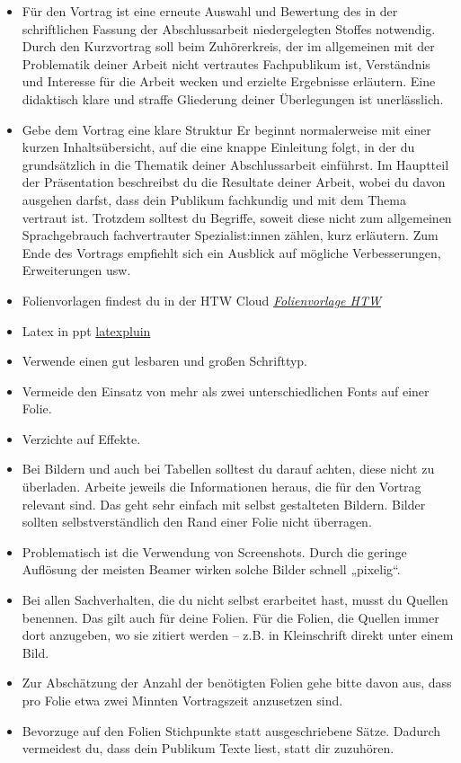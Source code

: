 \begin{itemize}
\item 
Für den Vortrag ist eine erneute Auswahl und Bewertung des in der schriftlichen Fassung der Abschlussarbeit niedergelegten Stoffes notwendig. Durch den Kurzvortrag soll beim Zuhörerkreis, der im allgemeinen mit der Problematik deiner Arbeit nicht vertrautes Fachpublikum ist, Verständnis und Interesse für die Arbeit wecken und erzielte Ergebnisse erläutern. Eine didaktisch klare und straffe Gliederung deiner Überlegungen ist unerlässlich. 

\item
Gebe dem Vortrag eine klare Struktur Er beginnt normalerweise mit einer kurzen Inhaltsübersicht, auf die eine knappe Einleitung folgt, in der du grundsätzlich in die Thematik deiner Abschlussarbeit einführst. Im Hauptteil der Präsentation beschreibst du die Resultate deiner Arbeit, wobei du davon ausgehen darfst, dass dein Publikum fachkundig und mit dem Thema vertraut ist. Trotzdem solltest du Begriffe, soweit diese nicht zum allgemeinen Sprachgebrauch  fachvertrauter Spezialist:innen zählen, kurz erläutern. Zum Ende des Vortrags empfiehlt sich ein Ausblick auf mögliche Verbesserungen, Erweiterungen usw.

    \item Folienvorlagen findest du in der HTW Cloud \hyperlink{
https://corporatedesign.htw-berlin.de/musterdokumente/powerpoint-vorlagen/}{\emph{Folienvorlage HTW}} 
\item Latex in ppt
\hyperlink{http://www.jonathanleroux.org/software/iguanatex/}{latexpluin}
\item Verwende einen gut lesbaren und großen Schrifttyp. 
\item Vermeide den Einsatz von mehr als zwei unterschiedlichen Fonts auf einer Folie.
\item 
Verzichte auf Effekte. 
\item Bei Bildern und auch bei Tabellen solltest du darauf achten, diese nicht zu überladen. Arbeite jeweils die Informationen heraus, die für den Vortrag relevant sind. Das geht sehr einfach mit selbst gestalteten Bildern. Bilder sollten selbstverständlich den Rand einer Folie nicht überragen. 
\item Problematisch ist die Verwendung von Screenshots. Durch die geringe Auflösung der meisten Beamer wirken solche Bilder schnell „pixelig“. 
\item Bei allen Sachverhalten, die du nicht selbst erarbeitet hast, musst du Quellen benennen. Das gilt auch für deine Folien. Für die Folien, die Quellen immer dort anzugeben, wo sie zitiert werden – z.B. in Kleinschrift direkt unter einem Bild. 
\item Zur Abschätzung der Anzahl der benötigten Folien gehe bitte davon aus, dass pro Folie etwa zwei Minnten Vortragszeit anzusetzen sind.
 \item Bevorzuge auf den Folien Stichpunkte statt ausgeschriebene Sätze. Dadurch vermeidest du, dass dein Publikum Texte liest, statt dir zuzuhören. 
\end{itemize}

